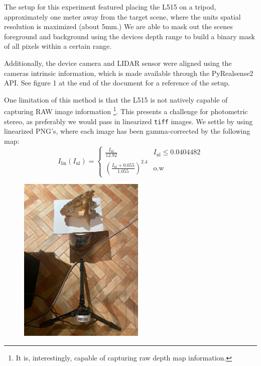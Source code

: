 \documentclass[final]{cvpr}
\begin{document}
The setup for this experiment featured placing the L515 on a tripod, approximately one meter away from the target scene, where the units spatial resolution is maximized (about 5mm.) We are able to mask out the scenes foreground and background using the devices depth range to build a binary mask of all pixels within a certain range. 

Additionally, the device camera and LIDAR sensor were aligned using the cameras intrinsic information, which is made available through the PyRealsense2 API. See figure 1 at the end of the document for a reference of the setup. 

One limitation of this method is that the L515 is not natively capable of capturing RAW image information \footnote{It is, interestingly, capable of capturing raw depth map information.}. This presents a challenge for photometric stereo, as preferably we would pass in linearized \verb|tiff| images. We settle by using linearized PNG's, where each image has been gamma-corrected by the following map: 
$$I_{\text{lin}}(I_{\text{nl}}) = \begin{cases}
	\frac{I_{\text{nl}}}{12.92} & I_{\text{nl}} \leq 0.0404482 \\
	\left(\frac{I_{\text{nl}}+0.055}{1.055}\right)^2.4 & \text{o.w}
\end{cases}$$
\begin{figure}
	\begin{minipage}[b]{0.4\textwidth}
		\centering
		\includegraphics[width=6cm]{experimental_setup}
	\end{minipage}
\end{figure}
\end{document}
